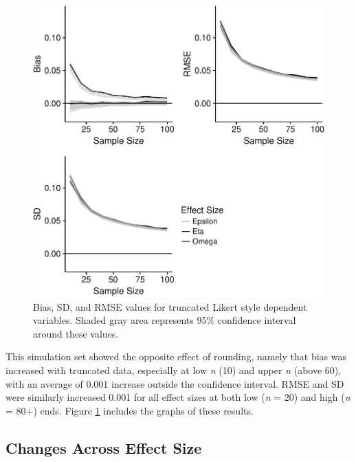 \documentclass[english,man]{apa6}
\theoremstyle{definition}
\theoremstyle{definition}
\theoremstyle{definition}
\theoremstyle{remark}
\begin{document}
\begin{figure}[htbp]
\centering
\includegraphics{buchanan_scofield_files/figure-latex/likerttrun-graph-1.pdf}
\caption{\label{fig:likerttrun-graph}Bias, SD, and RMSE values for truncated
Likert style dependent variables. Shaded gray area represents 95\%
confidence interval around these values.}
\end{figure}

This simulation set showed the opposite effect of rounding, namely that
bias was increased with truncated data, especially at low \emph{n} (10)
and upper \emph{n} (above 60), with an average of 0.001 increase outside
the confidence interval. RMSE and SD were similarly increased 0.001 for
all effect sizes at both low (\emph{n} = 20) and high (\emph{n} = 80+)
ends. Figure \ref{fig:likerttrun-graph} includes the graphs of these
results.

\subsection{Changes Across Effect
Size}\label{changes-across-effect-size}
\end{document}
